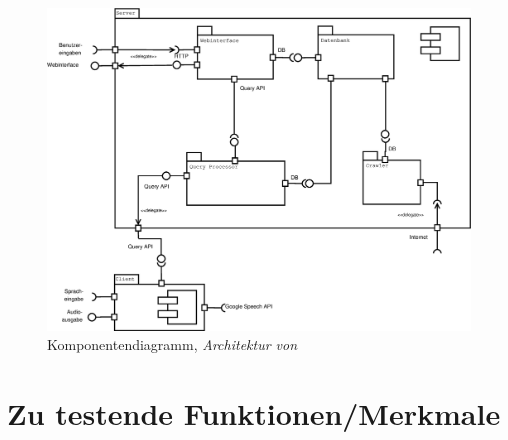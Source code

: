 \begin{figure}[h]
\centering
\includegraphics[width=1\textwidth]{Testspezifikation/testplan/komponenten}
\caption{Komponentendiagramm, \textit{Architektur von \NewsGenie}
\label{komponenten}}
\end{figure}

\pagebreak
\section{Zu testende Funktionen/Merkmale}

